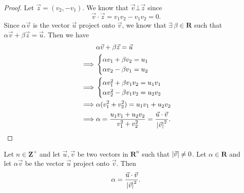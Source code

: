\begin{proof}
    Let \(\vec{z} = (v_2, -v_1)\).
    We know that \(\vec{v} \bot \vec{z}\) since
    \[
        \vec{v} \cdot \vec{z} = v_1 v_2 - v_1 v_2 = 0.
    \]
    Since \(\alpha \vec{v}\) is the vector \(\vec{u}\) project onto \(\vec{v}\), we know that \(\exists\ \beta \in \mathbf{R}\) such that \(\alpha \vec{v} + \beta \vec{z} = \vec{u}\).
    Then we have
    \begin{align*}
                 & \alpha \vec{v} + \beta \vec{z} = \vec{u}                                                           \\
        \implies & \begin{cases}
            \alpha v_1 + \beta v_2 = u_1 \\
            \alpha v_2 - \beta v_1 = u_2
        \end{cases}                                                                         \\
        \implies & \begin{cases}
            \alpha v_1^2 + \beta v_1 v_2 = u_1 v_1 \\
            \alpha v_2^2 - \beta v_1 v_2 = u_2 v_2
        \end{cases}                                                                         \\
        \implies & \alpha (v_1^2 + v_2^2) = u_1 v_1 + u_2 v_2                                                         \\
        \implies & \alpha = \frac{u_1 v_1 + u_2 v_2}{v_1^2 + v_2^2} = \frac{\vec{u} \cdot \vec{v}}{\abs*{\vec{v}}^2}.
    \end{align*}
\end{proof}

\begin{additional corollary}\label{ac 1.1.2}
Let \(n \in \mathbf{Z}^+\) and let \(\vec{u}, \vec{v}\) be two vectors in \(\mathbf{R}^n\) such that \(\abs*{\vec{v}} \neq 0\).
Let \(\alpha \in \mathbf{R}\) and let \(\alpha \vec{v}\) be the vector \(\vec{u}\) project onto \(\vec{v}\).
Then
\[
    \alpha = \frac{\vec{u} \cdot \vec{v}}{\abs*{\vec{v}}^2}.
\]
\end{additional corollary}

